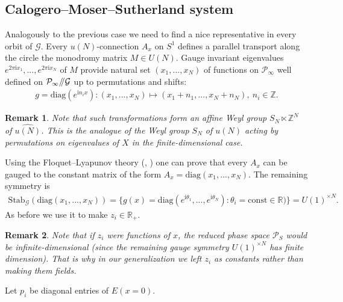 \documentclass[12pt]{article}
\newtheorem{rem}{Remark}[section]
\numberwithin{equation}{section}
\theoremstyle{definition}
\newcommand {\ii} {\mathrm{i}}
\begin{document}
\subsection{Calogero--Moser--Sutherland system}
Analogously to the previous case we need to find a nice representative in every orbit of $\mathcal{G}$.
Every $u(N)$-connection $A_x$ on $S^1$ defines a parallel transport along the circle the monodromy 
matrix $M \in U(N)$. Gauge invariant eigenvalues $e^{2 \pi {\ii} x_1} , ..., e^{2 \pi {\ii} x_N } $ of $M$ provide natural set $(x_1, ..., x_N)$ of functions on $\mathcal{P}_{\infty}$ well defined on $\mathcal{P}_{\infty} /\mkern-5mu/ \mathcal{G}$ up to permutations and shifts:
\begin{align*}
    g = \mathrm{diag}(e^{{\ii} n_i x}) : (x_1, ..., x_N) \mapsto (x_1 + n_1 , ..., x_N + n_N ), ~n_i \in \mathbb{Z}.
\end{align*}
\begin{rem}\normalfont
    Note that such transformations form an affine Weyl group $S_N \ltimes \mathbb{Z}^{N}$ of $\widehat{u(N)}$. This is the analogue of the Weyl group $S_N$ of $u(N)$ acting by permutations on eigenvalues of $X$ in the finite-dimensional case.
\end{rem}

Using the Floquet--Lyapunov theory (\cite{Fl}, \cite{Lyap}) one can prove that every $A_x$ can be gauged to the constant matrix of the form $A_x = \mathrm{diag}(x_1, ..., x_N )$. The remaining symmetry is
\begin{align*}
    \mathrm{Stab}_{\mathcal{G}}(\mathrm{diag}(x_1, ..., x_N )) = \{ g(x) = \mathrm{diag} (e^{{\ii}\theta_{1}},...,e^{{\ii}\theta_{N}} ): \theta_i = \mathrm{const} \in \mathbb{R}) \} = U(1)^{\times N}.
\end{align*}
As before we use it to make $z_i \in \mathbb{R}_{+}$.
\begin{rem}\normalfont
Note that if $z_i$ were functions of $x$, the reduced phase space $\mathcal{P}_{S}$ would be infinite-dimensional (since the remaining gauge symmetry $U(1)^{\times N}$ has finite dimension). That is why in our generalization we left $z_i$ as constants rather than making them fields.
\end{rem}


Let $p_i$ be diagonal entries of $E(x = 0)$.
\end{document}

